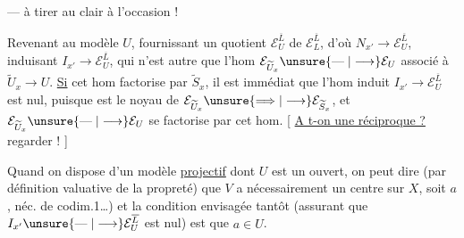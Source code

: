 --- à tirer au clair à l'occasion !

Revenant au modèle $U$, fournissant un quotient $\mathcal E_U^{\overline L}$ de $\mathcal E_L^{\overline L}$, d'où $N_{x'}\longrightarrow\mathcal E_U^{\overline L}$, induisant $I_{x'}\longrightarrow\mathcal E_U^{\overline L}$,
qui n'est autre que l'hom \unsure{---} $\mathcal E_{\widetilde U_x}\unsure{\mathrel{\text{---}}|\longrightarrow}\mathcal E_U$ associé à $\widetilde U_x\longrightarrow U$. \uline{Si} cet hom factorise par $\widetilde S_x$, il est immédiat que l'hom induit $I_{x'}\longrightarrow\mathcal E_U^{\overline L}$ est nul, puisque  est le noyau de $\mathcal E_{\widetilde U_x}\unsure{\Longrightarrow|\longrightarrow}\mathcal E_{\widetilde S_x}$, et $\mathcal E_{\widetilde U_x}\unsure{\mathrel{\text{---}}|\longrightarrow}\mathcal E_U$ se factorise par cet hom.
[ \uline{A t-on une réciproque ?} regarder ! ]

Quand on dispose d'un modèle \uline{projectif} dont $U$ est un ouvert, on peut dire (par définition valuative de la propreté) que $V$ a nécessairement un centre sur $X$, soit $a$,   néc. de codim.1\ldots) et la condition envisagée tantôt (assurant que $I_{x'}\unsure{\mathrel{\text{---}}|\longrightarrow}\mathcal E_U^{\overline L}$ est nul) est que $a\in U$.
